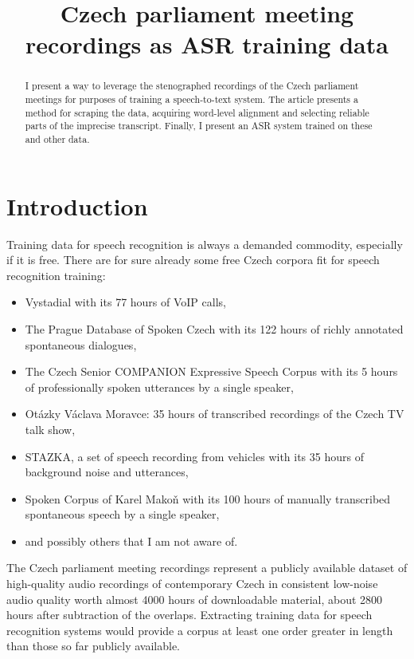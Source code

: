 \documentclass[conference]{IEEEtran}
\title{Czech parliament meeting recordings as ASR training data}
\author{
\IEEEauthorblockN{Jan Oldřich Krůza}
\IEEEauthorblockA{
Institute of Formal and Applied Linguistics,\\
Faculty of Mathematics and Physics,\\
Charles University\\
Email: kruza@ufal.mff.cuni.cz}
}
\begin{document}
\maketitle              %

\begin{abstract}
I present a way to leverage the stenographed recordings of the Czech parliament
meetings for purposes of training a speech-to-text system. The article presents
a method for scraping the data, acquiring word-level alignment and selecting
reliable parts of the imprecise transcript. Finally, I present an ASR system
trained on these and other data.
\end{abstract}


\section{Introduction}
\label{sec:intro}

Training data for speech recognition is always a demanded commodity, especially
if it is free. There are for sure already some free Czech corpora fit for speech
recognition training:
\begin{itemize}
\item{
    Vystadial\cite{vystadialarticle} with its 77 hours of VoIP
    calls\cite{vystadialdata}, 
}
\item{
    The Prague Database of Spoken Czech\cite{pdtscarticle} with its 122 hours
    of richly annotated spontaneous dialogues\cite{pdtscdata},
}
\item{
    The Czech Senior COMPANION Expressive Speech Corpus with its 5 hours
    of professionally spoken utterances by a single speaker\cite{companiondata},
}
\item{
    Otázky Václava Moravce: 35 hours of transcribed recordings of the
    Czech TV talk show\cite{ovmdata},
}
\item{
    STAZKA, a set of speech recording from vehicles with its 35 hours of
    background noise and utterances\cite{stazkadata},
}
\item{
    Spoken Corpus of Karel Makoň\cite{kruuza2012making} with its 100 hours of
    manually transcribed spontaneous speech by a single speaker\cite{makondata},
}
\item{and possibly others that I am not aware of.}
\end{itemize}

The Czech parliament meeting recordings represent a publicly available dataset
of high-quality audio recordings of contemporary Czech in consistent low-noise
audio quality worth almost 4000 hours of downloadable material, about 2800 hours
after subtraction of the overlaps. Extracting
training data for speech recognition systems would provide a corpus at least
one order greater in length than those so far publicly available.
\end{document}
